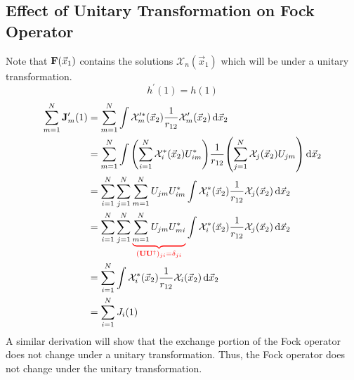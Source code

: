 \documentclass[12pt,a4paper,titlepage]{article}
\newcommand{\Chi}{\mathcal{X}} %
\begin{document}
\subsection{Effect of Unitary Transformation on Fock Operator}
Note that $\vb{F}(\vec{x}_{1})$ contains the solutions $\Chi_{n}(\vec{x}_{1})$ which will be under a unitary transformation.
\begin{equation}
h^{\prime}(1)=h(1)
\end{equation}
\begin{equation}
\begin{aligned}
\sum_{m=1}^{N}\vb{J}_{m}^{\prime}(1)&=\sum_{m=1}^{N}\int\Chi_{m}^{\prime *}(\vec{x}_{2})\frac{1}{r_{12}}\Chi_{m}^{\prime}(\vec{x}_{2})\dd{\vec{x}_{2}}\\
&=\sum_{m=1}^{N}\int\qty(\sum_{i=1}^{N}\Chi_{i}^{*}(\vec{x}_{2})U_{im}^{*})\frac{1}{r_{12}}\qty(\sum_{j=1}^{N}\Chi_{j}(\vec{x}_{2})U_{jm})\dd{\vec{x}_{2}}\\
&=\sum_{i=1}^{N}\sum_{j=1}^{N}\sum_{m=1}^{N}U_{jm}U_{im}^{*}\int\Chi_{i}^{*}(\vec{x}_{2})\frac{1}{r_{12}}\Chi_{j}(\vec{x}_{2})\dd{\vec{x}_{2}}\\
&=\sum_{i=1}^{N}\sum_{j=1}^{N}{\color{red}\underbrace{\color{black}\sum_{m=1}^{N}U_{jm}U_{mi}^{*}}_{(\vb{U}\vb{U}^{\dagger})_{ji}=\delta_{ji}}}\int\Chi_{i}^{*}(\vec{x}_{2})\frac{1}{r_{12}}\Chi_{j}(\vec{x}_{2})\dd{\vec{x}_{2}}\\
&=\sum_{i=1}^{N}\int\Chi_{i}^{*}(\vec{x}_{2})\frac{1}{r_{12}}\Chi_{i}(\vec{x}_{2})\dd{\vec{x}_{2}}\\
&=\sum_{i=1}^{N}J_{i}(1)
\end{aligned}
\end{equation}
A similar derivation will show that the exchange portion of the Fock operator does not change under a unitary transformation. Thus, the Fock operator does not change under the unitary transformation.
\end{document}
